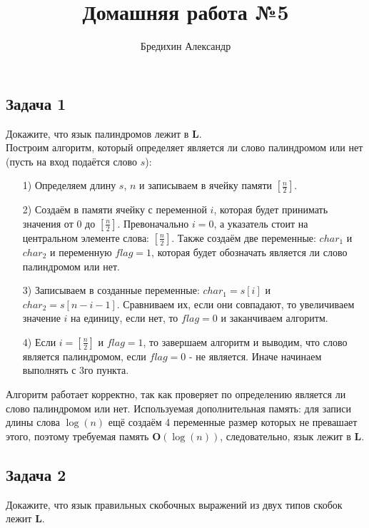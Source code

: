 \documentclass[a4paper,12pt]{article} %
\author{Бредихин Александр}
\title{Домашняя работа №5}
\begin{document}
\maketitle

\subsection*{Задача 1}
Докажите, что язык палиндромов лежит в $\mathbf{L}$.\\

Построим алгоритм, который определяет является ли слово палиндромом или нет (пусть на вход подаётся слово $ s $):
\begin{itemize}
\item[1)] Определяем длину $ s $, $ n $ и записываем в ячейку памяти $ \left[ \frac{n}{2} \right] $.
\item[2)] Создаём в памяти ячейку с переменной $ i $, которая будет принимать значения от $ 0 $ до $ \left[ \frac{n}{2} \right] $. Превоначально $ i = 0 $, а указатель стоит на центральном элементе слова: $ \left[ \frac{n}{2} \right] $. Также создаём две переменные: $ char_1 $ и $ char_2 $ и переменную $ flag = 1$, которая будет обозначать является ли слово палиндромом или нет.
\item[3)] Записываем в созданные переменные: $ char_1 = s[i]$ и $ char_2 = s[n-i-1]$. Сравниваем их, если они совпадают, то увеличиваем значение $ i $ на единицу, если нет, то $ flag = 0 $ и заканчиваем алгоритм.
\item[4)] Если $ i = \left[ \frac{n}{2} \right] $ и $ flag = 1 $, то завершаем алгоритм и выводим, что слово является палиндромом, если $ flag = 0 $ - не является. Иначе начинаем выполнять с 3го пункта.
\end{itemize}
Алгоритм работает корректно, так как проверяет по определению является ли слово палиндромом или нет. Используемая дополнительная память: для записи длины слова $ \log(n) $ ещё создаём 4 переменные размер которых не превашает этого, поэтому требуемая память $\mathbf{O}(\log(n))$, следовательно, язык лежит в  $\mathbf{L}$.

\subsection*{Задача 2}
Докажите, что язык правильных скобочных выражений из двух типов скобок лежит $\mathbf{L}$.\\
\end{document}
